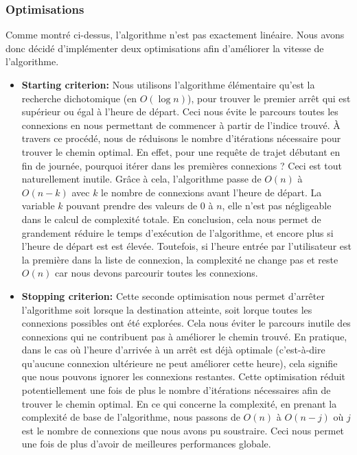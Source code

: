 \documentclass[12pt]{article}
\begin{document}
\subsubsection{Optimisations}
Comme montré ci-dessus, l'algorithme n'est pas exactement linéaire. Nous avons donc décidé d'implémenter deux optimisations afin d'améliorer la vitesse de l'algorithme.
\begin{itemize}
    \item \textbf{Starting criterion:} Nous utilisons l'algorithme élémentaire qu'est la recherche dichotomique (en $O(\log n)$), pour trouver le premier arrêt 
    qui est supérieur ou égal à l'heure de départ. Ceci nous évite le parcours toutes les connexions en nous permettant de commencer à partir de l'indice trouvé.
    À travers ce procédé, nous de réduisons le nombre d'itérations nécessaire pour trouver le chemin optimal. En effet, pour une requête de trajet débutant en fin
    de journée, pourquoi itérer dans les premières connexions ? Ceci est tout naturellement inutile. Grâce à cela, l'algorithme passe de $O(n)$ à $O(n - k)$ 
    avec $k$ le nombre de connexions avant l'heure de départ. La variable $k$ pouvant prendre des valeurs de $0$ à $n$, elle n'est pas négligeable dans le calcul
    de complexité totale. En conclusion, cela nous permet de grandement réduire le temps d'exécution de l'algorithme, et encore plus si l'heure de départ est
    est élevée. Toutefois, si l'heure entrée par l'utilisateur est la première dans la liste de connexion, la complexité ne change pas et reste $O(n)$ car nous
    devons parcourir toutes les connexions.
    \item \textbf{Stopping criterion:} Cette seconde optimisation nous permet d'arrêter l'algorithme soit lorsque la destination atteinte, soit lorque toutes 
    les connexions possibles ont été explorées. Cela nous éviter le parcours inutile des connexions qui ne contribuent pas à améliorer le chemin trouvé. 
    En pratique, dans le cas où l'heure d'arrivée à un arrêt est déjà optimale (c'est-à-dire qu'aucune connexion ultérieure ne peut améliorer cette heure), cela signifie
    que nous pouvons ignorer les connexions restantes. Cette optimisation réduit potentiellement une fois de plus le nombre d'itérations nécessaires afin de trouver le
    chemin optimal. En ce qui concerne la complexité, en prenant la complexité de base de l'algorithme, nous passons de $O(n)$ à $O(n - j)$ où $j$ est le nombre de 
    connexions que nous avons pu soustraire. Ceci nous permet une fois de plus d'avoir de meilleures performances globale.

\end{itemize}
\end{document}

